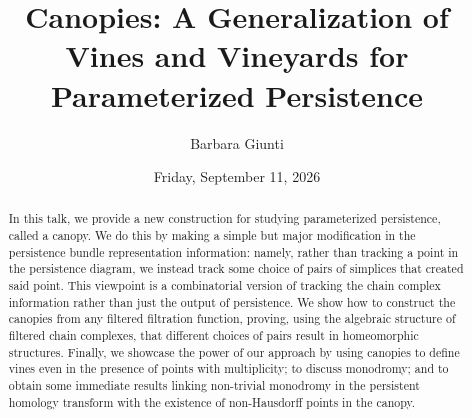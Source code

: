 \documentclass{UAmathtalk}
\author{Barbara Giunti}
\title{Canopies: A Generalization of Vines and Vineyards for Parameterized Persistence}
\date{Friday, September 11, 2026}
\begin{document}
\maketitle
\begin{abstract}
In this talk, we provide a new construction for studying parameterized persistence, called a canopy. We do this by making a simple but major modification in the persistence bundle representation information: namely, rather than tracking a point in the persistence diagram, we instead track some choice of pairs of simplices that created said point. This viewpoint is a combinatorial version of tracking the chain complex information rather than just the output of persistence. We show how to construct the canopies from any filtered filtration function, proving, using the algebraic structure of filtered chain complexes, that different choices of pairs result in homeomorphic structures. Finally, we showcase the power of our approach by using canopies to define vines even in the presence of points with multiplicity; to discuss monodromy; and to obtain some immediate results linking non-trivial monodromy in the persistent homology transform with the existence of non-Hausdorff points in the canopy.
\end{abstract}
\end{document}
